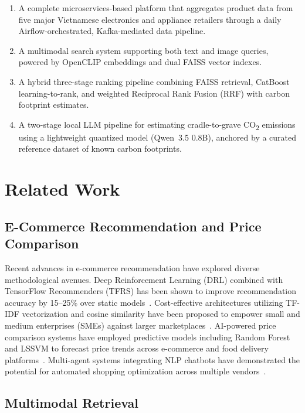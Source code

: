 \documentclass[conference]{IEEEtran}
\begin{document}
\begin{enumerate}
    \item A complete microservices-based platform that aggregates product data from five major Vietnamese electronics and appliance retailers through a daily Airflow-orchestrated, Kafka-mediated data pipeline.
    \item A multimodal search system supporting both text and image queries, powered by OpenCLIP embeddings and dual FAISS vector indexes.
    \item A hybrid three-stage ranking pipeline combining FAISS retrieval, CatBoost learning-to-rank, and weighted Reciprocal Rank Fusion (RRF) with carbon footprint estimates.
    \item A two-stage local LLM pipeline for estimating cradle-to-grave CO\textsubscript{2} emissions using a lightweight quantized model (Qwen~3.5 0.8B), anchored by a curated reference dataset of known carbon footprints.
\end{enumerate}

\section{Related Work}

\subsection{E-Commerce Recommendation and Price Comparison}

Recent advances in e-commerce recommendation have explored diverse methodological avenues. Deep Reinforcement Learning (DRL) combined with TensorFlow Recommenders (TFRS) has been shown to improve recommendation accuracy by 15--25\% over static models~\cite{paper1}. Cost-effective architectures utilizing TF-IDF vectorization and cosine similarity have been proposed to empower small and medium enterprises (SMEs) against larger marketplaces~\cite{paper2}. AI-powered price comparison systems have employed predictive models including Random Forest and LSSVM to forecast price trends across e-commerce and food delivery platforms~\cite{paper3}. Multi-agent systems integrating NLP chatbots have demonstrated the potential for automated shopping optimization across multiple vendors~\cite{paper4}.

\subsection{Multimodal Retrieval}
\end{document}
